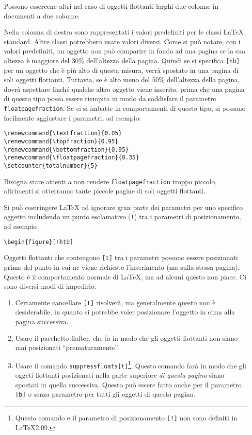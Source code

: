 \documentclass[a4paper,italian]{article}
\def\latex/{\protect\LaTeX{}}
\newcommand{\bs}{\symbol{'134}}
\newcommand{\Cmd}[1]{\texttt{\def\{{\char`\{}\def\}{\char`\}}\bs#1}}
\renewcommand{\topfraction}{0.9}
\renewcommand{\bottomfraction}{0.9}
\renewcommand{\textfraction}{0.05}
\begin{document}
Possono essercene altri nel caso di oggetti flottanti larghi due colonne
in documenti a due colonne.

Nella colonna di destra sono rappresentati i valori predefiniti per le
classi \latex/ standard. Altre classi potrebbero usare valori
diversi. Come si pu\`o notare, con i valori predefiniti, un oggetto
non pu\`o comparire in fondo ad una pagina se la sua altezza \`e maggiore
del 30\% dell'altezza della pagina. Quindi se si specifica \texttt{[hb]} per
un oggetto che \`e pi\`u alto di questa misura, verr\`a spostato in una
pagina di soli oggetti flottanti. Tuttavia, se \`e alto meno del 50\%
dell'altezza della pagina, dovr\`a aspettare finch\'e qualche altro oggetto
viene inserito, prima che una pagina di questo tipo possa essere riempita in
modo da soddisfare il parametro \Cmd{floatpagefraction}. Se ci si imbatte in
comportamenti di questo tipo, si possono facilmente aggiustare i parametri,
ad esempio:
\begin{verbatim}
\renewcommand{\textfraction}{0.05}
\renewcommand{\topfraction}{0.95}
\renewcommand{\bottomfraction}{0.95}
\renewcommand{\floatpagefraction}{0.35}
\setcounter{totalnumber}{5}
\end{verbatim}
Bisogna stare attenti a non rendere \Cmd{floatpagefraction} troppo piccolo,
altrimenti si otterranno tante piccole pagine di soli oggetti flottanti.

Si pu\`o costringere \latex/ ad ignorare gran parte dei parametri per uno
specifico oggetto includendo un punto esclamativo (\texttt{!}) tra i
parametri di posizionamento, ad esempio
\begin{verbatim}
\begin{figure}[!htb]
\end{verbatim}

Oggetti flottanti che contengono \texttt{[t]} tra i parametri possono
essere posizionati prima del punto in cui ne viene richiesto l'inserimento
(ma sulla stessa pagina).
Questo \`e il comportamento normale di \latex/, ma ad alcuni questo non piace.
Ci sono diversi modi di impedirlo: 
\begin{enumerate}
\item Certamente cancellare \texttt{[t]} risolver\`a, ma generalmente
  questo non \`e desiderabile, in quanto si potrebbe voler posizionare
  l'oggetto in cima alla pagina successiva.
\item Usare il pacchetto \textsf{flafter}, che fa in modo che gli oggetti
  flottanti non siano mai posizionati ``prematuramente''.
\item Usare il comando \Cmd{suppressfloats[t]}\footnote{Questo comando e
  il parametro di posizionamento \texttt{[!]} non sono definiti in
  \LaTeX2.09.}.  Questo comando far\`a in modo che gli oggeti flottanti
  posizionati nella parte superiore \emph{di questa pagina} siano spostati
  in quella successiva. Questo pu\`o essere fatto anche per il parametro
  \texttt{[b]} o senza parametro per tutti gli oggetti di questa pagina.
\end{enumerate}
\end{document}
